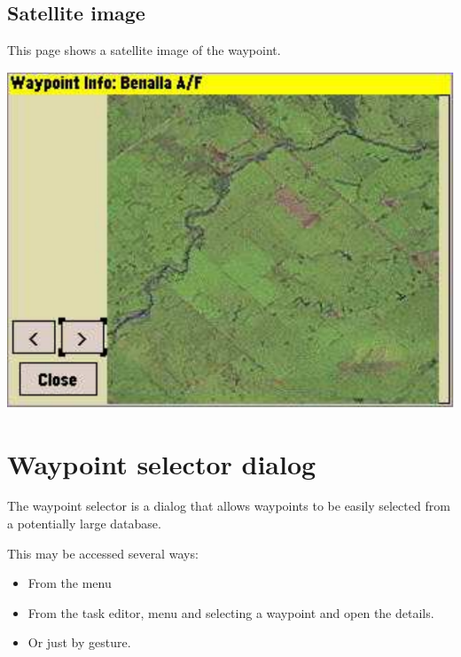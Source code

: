 \documentclass[a4paper,12pt]{refrep}
\begin{document}
\subsection*{Satellite image}
This page shows a satellite image of the
waypoint.

\begin{center}
\includegraphics[angle=0,width=0.8\linewidth,keepaspectratio='true']{figures/dialog-waypointdetails2.pdf}
\end{center}


\section{Waypoint selector dialog}\label{sec:waypoint-selector-dialog}
The waypoint selector is a dialog that allows waypoints to be easily selected
from a potentially large database.

This may be accessed several ways:
\begin{itemize}
\item  From the menu \blink{}
\item  From the task editor, menu \blink{}\blink{} and selecting a waypoint and open the details.
\item  Or just by gesture.
\end{itemize}
\end{document}
